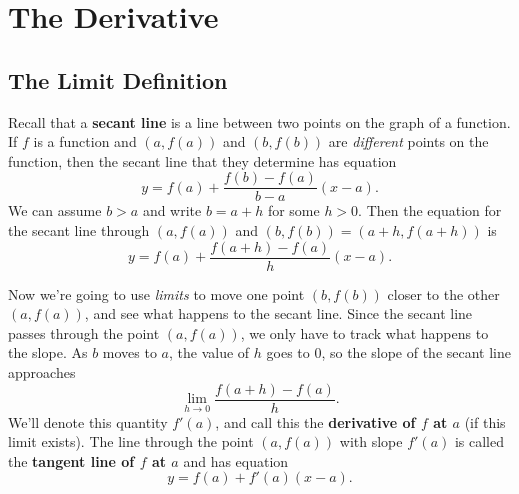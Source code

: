 \section{The Derivative}

\subsection{The Limit Definition}

\begin{multicols}{2}

Recall that a \textbf{secant line} is a line between two points on the graph of a function. If $f$ is a function and $(a,f(a))$ and $(b,f(b))$ are \textit{different} points on the function, then the secant line that they determine has equation
$$y=f(a) + \frac{f(b)-f(a)}{b-a}(x-a).$$
We can assume $b>a$ and write $b=a+h$ for some $h>0$. Then the equation for the secant line through $(a,f(a))$ and $(b,f(b))=(a+h,f(a+h))$ is
$$y=f(a) + \frac{f(a+h)-f(a)}{h}(x-a).$$


Now we're going to use \textit{limits} to move one point $(b,f(b))$ closer to the other $(a,f(a))$, and see what happens to the secant line. Since the secant line passes through the point $(a,f(a))$, we only have to track what happens to the slope. As $b$ moves to $a$, the value of $h$ goes to $0$, so the slope of the secant line approaches
$$\lim_{h\to 0}\frac{f(a+h)-f(a)}{h}.$$
We'll denote this quantity $f'(a)$, and call this the \textbf{derivative of $f$ at $a$} (if this limit exists). The line through the point $(a,f(a))$ with slope $f'(a)$ is called the \textbf{tangent line of $f$ at $a$} and has equation
$$y=f(a)+f'(a)(x-a).$$

\columnbreak

\end{multicols}
